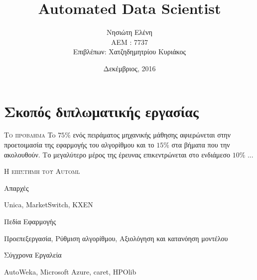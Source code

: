\documentclass{beamer}
\title{Automated Data Scientist}
\date{Δεκέμβριος, 2016}
\author{Νησιώτη Ελένη \\AEM : 7737 \\ Επιβλέπων: Χατζηδημητρίου Κυριάκος}
\institute{Αριστοτέλειο Πανεπιστήμιο Θεσσαλονικής \\ ΗΜΜΥ}
\begin{document}
  \maketitle
  \section{Σκοπός διπλωματικής εργασίας}
  \begin{frame}{ \scshape Το πρόβλημα}
   To $ 75 \% $ ενός πειράματος μηχανικής μάθησης αφιερώνεται στην προετοιμασία της εφαρμογής του αλγορίθμου και το $15 \% $ στα βήματα που την ακολουθούν. Το μεγαλύτερο μέρος της έρευνας επικεντρώνεται στο ενδιάμεσο $10 \%$ ...
   \\[12pt]
  \end{frame}
  
  \begin{frame}{ \scshape Η επιστήμη του Automl}
  	\begin{minipage}[t]{.4\textwidth}  		
  		Απαρχές
  		\vspace{4ex}
  	\end{minipage}%
  	  	\begin{minipage}[t]{.5\textwidth}
  	  		Unica, MarketSwitch, KXEN  	
  	  		\vspace{4ex}
  	  	\end{minipage}
  	\begin{minipage}[t]{.4\textwidth}  		
  		Πεδία Εφαρμογής
  		\vspace{4ex}
  	\end{minipage}%
  	\begin{minipage}[t]{.5\textwidth}
  		Προεπεξεργασία, Ρύθμιση αλγορίθμου, Αξιολόγηση και κατανόηση μοντέλου
  		\vspace{4ex} 
  	\end{minipage}
  	\begin{minipage}[t]{.4\textwidth}  		
  		Σύγχρονα Εργαλεία
  		\vspace{4ex}
  	\end{minipage}%
	\begin{minipage}[t]{.5\textwidth}
  		AutoWeka, Microsoft Azure, caret, HPOlib
  		\vspace{4ex}
  	\end{minipage}
  \end{frame}
  
\end{document}
